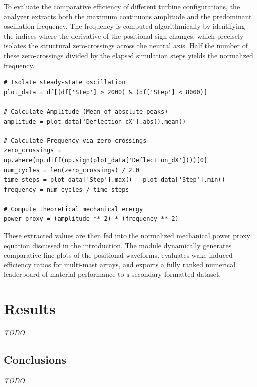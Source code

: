 \documentclass[11pt,a4paper]{article}
\begin{document}
To evaluate the comparative efficiency of different turbine configurations, the analyzer extracts both the maximum continuous amplitude and the predominant oscillation frequency. The frequency is computed algorithmically by identifying the indices where the derivative of the positional sign changes, which precisely isolates the structural zero-crossings across the neutral axis. Half the number of these zero-crossings divided by the elapsed simulation steps yields the normalized frequency.

\begin{lstlisting}[style=pystyle]
# Isolate steady-state oscillation
plot_data = df[(df['Step'] > 2000) & (df['Step'] < 8000)]

# Calculate Amplitude (Mean of absolute peaks)
amplitude = plot_data['Deflection_dX'].abs().mean()

# Calculate Frequency via zero-crossings
zero_crossings = np.where(np.diff(np.sign(plot_data['Deflection_dX'])))[0]
num_cycles = len(zero_crossings) / 2.0
time_steps = plot_data['Step'].max() - plot_data['Step'].min()
frequency = num_cycles / time_steps 

# Compute theoretical mechanical energy
power_proxy = (amplitude ** 2) * (frequency ** 2)
\end{lstlisting}

These extracted values are then fed into the normalized mechanical power proxy equation discussed in the introduction. The module dynamically generates comparative line plots of the positional waveforms, evaluates wake-induced efficiency ratios for multi-mast arrays, and exports a fully ranked numerical leaderboard of material performance to a secondary formatted dataset.
\section{Results}
\textit{TODO.}


\subsection{Conclusions}
\textit{TODO.}

\printbibliography
\end{document}
